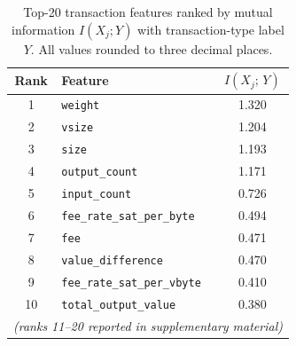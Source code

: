 \begin{table}[t]
  \caption{Top-20 transaction features ranked by mutual information
           $I(X_j; Y)$ with transaction-type label $Y$.
           All values rounded to three decimal places.}
  \label{tab:mi_top20}
  \centering
  \renewcommand{\arraystretch}{1.12}
  \begin{tabular}{@{}clc@{}}
    \toprule
    \textbf{Rank} & \textbf{Feature} & $I(X_j;\,Y)$ \\
    \midrule
    1  & \texttt{weight}                   & 1.320 \\
    2  & \texttt{vsize}                    & 1.204 \\
    3  & \texttt{size}                     & 1.193 \\
    4  & \texttt{output\_count}            & 1.171 \\
    5  & \texttt{input\_count}             & 0.726 \\
    6  & \texttt{fee\_rate\_sat\_per\_byte}& 0.494 \\
    7  & \texttt{fee}                      & 0.471 \\
    8  & \texttt{value\_difference}        & 0.470 \\
    9  & \texttt{fee\_rate\_sat\_per\_vbyte}& 0.410 \\
    10 & \texttt{total\_output\_value}     & 0.380 \\
    \multicolumn{3}{c}{\textit{(ranks 11--20 reported in supplementary material)}} \\
    \bottomrule
  \end{tabular}
\end{table}
